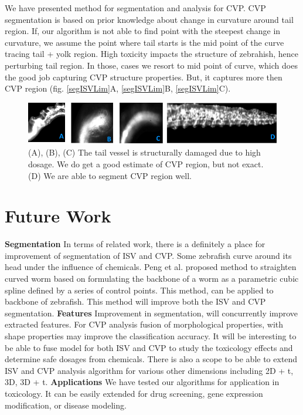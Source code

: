 We have presented method for segmentation and analysis for CVP. CVP segmentation is based on prior knowledge about change in curvature around tail region. If, our algorithm is not able to find point with the steepest change in curvature, we assume the point where tail starts is the mid point of the curve tracing tail + yolk region. High toxicity impacts the structure of zebrahish, hence perturbing tail region. In those, cases we resort to mid point of curve, which does the good job capturing CVP structure properties. But, it captures more then CVP region (fig. \ref{segISVLim}A, \ref{segISVLim}B, \ref{segISVLim}C). 


\begin{figure}[H] 
 \centering
\includegraphics[scale=0.6]{figure/segCVPLim.png}
  \caption[Images with the blurred and noisy CVP]{(A), (B), (C) The tail vessel is structurally damaged due to high dosage. We do get a good estimate of CVP region, but not exact. (D) We are able to segment CVP region well.}
 \label{segCVPLim}
\end{figure}

\section{Future Work}

\textbf{Segmentation}
\newline
In terms of related work, there is a definitely a place for improvement of segmentation of ISV and CVP. Some zebrafish curve around its head under the influence of chemicals. Peng et al. \cite{peng2008} proposed method to straighten curved worm based on formulating the backbone of a worm as a parametric cubic spline defined by a series of control points. This method, can be applied to backbone of zebrafish. This method will improve both the ISV and CVP segmentation.
\textbf{Features}
\newline
Improvement in segmentation, will concurrently improve extracted features. For CVP analysis fusion of morphological properties, with shape properties may improve the classification accuracy. It will be interesting to be able to fuse model for both ISV and CVP to study the toxicology effects and determine safe dosages from chemicals. There is also a scope to be able to extend ISV and CVP analysis algorithm for various other dimensions including 2D + t, 3D, 3D + t. 
\textbf{Applications}
\newline
We have tested our algorithms for application in toxicology. It can be easily extended for drug screening, gene expression modification, or disease modeling. 

% 
